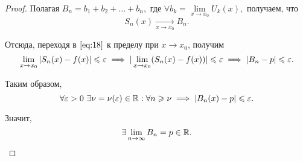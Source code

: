 \documentclass[../../main.tex]{subfiles}
\begin{document}
\begin{proof}
	Полагая $B_n = b_1 + b_2 + \ldots + b_n,$ где $\forall b_k = \lim\limits_{x 
	\to x_0}U_k(x),$
получаем, что 
\[
	S_n(x) \underset{x \to x_0}\longrightarrow B_n.
\]

Отсюда, переходя в $\eqref{eq:18}$ к пределу при $x \to x_0$, получим
\[
 \lim_{x \to x_0}|S_n(x) - f(x)| \leqslant \varepsilon \implies
 |\lim_{x \to x_0}(S_n(x) - f(x))| \leqslant \varepsilon \implies |B_n - p| \leqslant \varepsilon.
\]

Таким образом, 
\[
\forall \eps > 0 \ \exists \nu = \nu(\eps) \in \R : \forall n \ge \nu \implies 
|B_n(x) - p| \le \eps.
\]

Значит, 
\[
\exists \lim_{n \to \infty} B_n = p \in \mathbb{R}.
\]
\end{proof}
	
\end{document}
